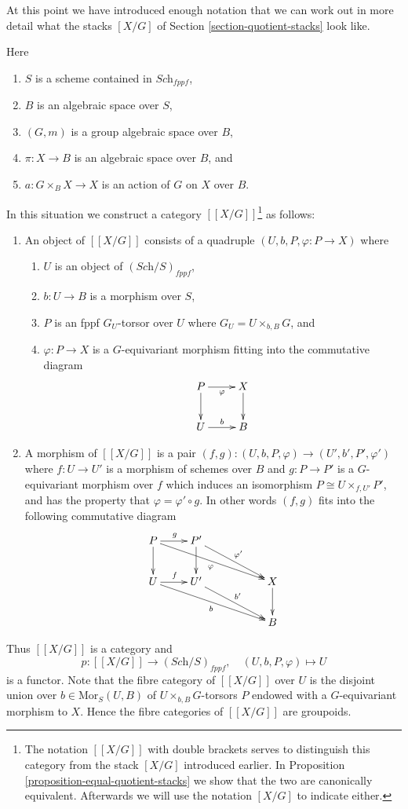 \noindent
At this point we have introduced enough notation that we can work out
in more detail what the stacks $[X/G]$ of
Section \ref{section-quotient-stacks}
look like.

\begin{situation}
\label{situation-quotient-stack}
Here
\begin{enumerate}
\item $S$ is a scheme contained in $\textit{Sch}_{fppf}$,
\item $B$ is an algebraic space over $S$,
\item $(G, m)$ is a group algebraic space over $B$,
\item $\pi : X \to B$ is an algebraic space over $B$, and
\item $a : G \times_B X \to X$ is an action of $G$ on $X$ over $B$.
\end{enumerate}
\end{situation}

\noindent
In this situation we construct a category $[[X/G]]$\footnote{The notation
$[[X/G]]$ with double brackets serves to distinguish this category from
the stack $[X/G]$ introduced earlier. In
Proposition \ref{proposition-equal-quotient-stacks}
we show that the two are canonically equivalent.
Afterwards we will use the notation $[X/G]$ to indicate either.} as follows:
\begin{enumerate}
\item An object of $[[X/G]]$ consists of a quadruple
$(U, b, P, \varphi : P \to X)$ where
\begin{enumerate}
\item $U$ is an object of $(\textit{Sch}/S)_{fppf}$,
\item $b : U \to B$ is a morphism over $S$,
\item $P$ is an fppf $G_U$-torsor over $U$ where $G_U = U \times_{b, B} G$, and
\item $\varphi : P \to X$ is a $G$-equivariant morphism fitting
into the commutative diagram
$$
\xymatrix{
P \ar[d] \ar[r]_{\varphi} & X \ar[d] \\
U \ar[r]^b & B
}
$$
\end{enumerate}
\item A morphism of $[[X/G]]$ is a pair
$(f, g) : (U, b, P, \varphi) \to (U', b', P', \varphi')$
where $f : U \to U'$ is a morphism of schemes over $B$
and $g : P \to P'$ is a $G$-equivariant morphism over $f$
which induces an isomorphism $P \cong U \times_{f, U'} P'$, and has
the property that $\varphi = \varphi' \circ g$.
In other words $(f, g)$ fits into the following commutative
diagram
$$
\xymatrix{
P \ar[d] \ar[rrrd]_\varphi \ar[r]^g & P' \ar[d] \ar[rrd]^{\varphi'} \\
U \ar[rrrd]_b \ar[r]^f & U' \ar[rrd]^{b'} & & X \ar[d] \\
& & & B
}
$$
\end{enumerate}
Thus $[[X/G]]$ is a category and
$$
p : [[X/G]] \longrightarrow (\textit{Sch}/S)_{fppf},
\quad
(U, b, P, \varphi) \longmapsto U
$$
is a functor. Note that the fibre category of $[[X/G]]$
over $U$ is the disjoint union over $b \in \text{Mor}_S(U, B)$
of $U \times_{b, B} G$-torsors $P$ endowed with a $G$-equivariant
morphism to $X$. Hence the fibre categories of $[[X/G]]$ are groupoids.

